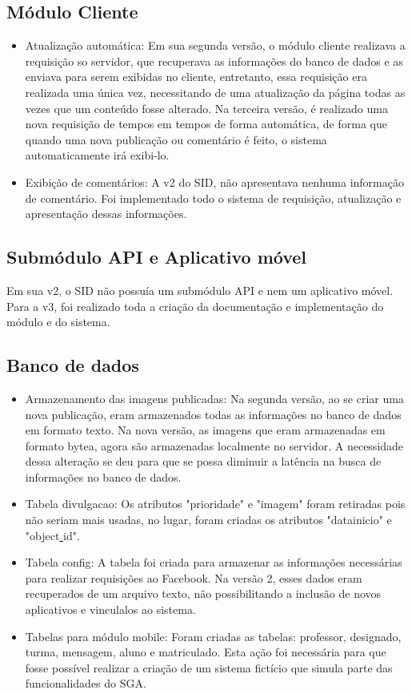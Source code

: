\subsection{Módulo Cliente}
    \begin{itemize}
        \item Atualização automática: Em sua segunda versão, o módulo cliente realizava a requisição so servidor, que recuperava as informações do banco de dados e as enviava para serem exibidas no cliente, entretanto, essa requisição era realizada uma única vez, necessitando de uma atualização da página todas as vezes que um conteúdo fosse alterado. Na terceira versão, é realizado uma nova requisição de tempos em tempos de forma automática, de forma que quando uma nova publicação ou comentário é feito, o sistema automaticamente irá exibi-lo.
        
        \item Exibição de comentários: A v2 do SID, não apresentava nenhuma informação de comentário. Foi implementado todo o sistema de requisição, atualização e apresentação dessas informações.
    \end{itemize}
\subsection{Submódulo API e Aplicativo móvel}
Em sua v2, o SID não possuía um submódulo API e nem um aplicativo móvel. Para a v3, foi realizado toda a criação da documentação e implementação do módulo e do sistema.

\subsection{Banco de dados}
    \begin{itemize}
        \item Armazenamento das imagens publicadas: Na segunda versão, ao se criar uma nova publicação, eram armazenados todas as informações no banco de dados em formato texto. Na nova versão, as imagens que eram armazenadas em formato bytea, agora são armazenadas localmente no servidor. A necessidade dessa alteração se deu para que se possa diminuir a latência na busca de informações no banco de dados.
            
        \item Tabela divulgacao: Os atributos "prioridade" e "imagem" foram retiradas pois não seriam mais usadas, no lugar, foram criadas os atributos "datainicio" e "object\underline{{ }}id".
            
        \item Tabela config: A tabela foi criada para armazenar as informações necessárias para realizar requisições ao Facebook. Na versão 2, esses dados eram recuperados de um arquivo texto, não possibilitando a inclusão de novos aplicativos e vinculalos ao sistema.
        
        \item Tabelas para módulo mobile: Foram criadas as tabelas: professor, designado, turma, mensagem, aluno e matriculado. Esta ação foi necessária para que fosse possível realizar a criação de um sistema fictício que simula parte das funcionalidades do SGA.
    \end{itemize}


